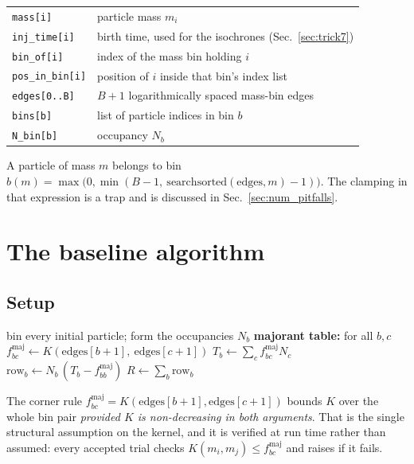 \documentclass[a4paper,12pt]{article}
\newcommand{\fmaj}{f^{\mathrm{maj}}}
\newcommand{\code}[1]{\texttt{#1}}
\begin{document}
\begin{center}
\small
\begin{tabular}{@{}ll@{}}
\toprule
\code{mass[i]}       & particle mass $m_i$ \\
\code{inj\_time[i]}  & birth time, used for the isochrones (Sec.~\ref{sec:trick7}) \\
\code{bin\_of[i]}    & index of the mass bin holding $i$ \\
\code{pos\_in\_bin[i]} & position of $i$ inside that bin's index list \\
\midrule
\code{edges[0..B]}   & $B+1$ logarithmically spaced mass-bin edges \\
\code{bins[b]}       & list of particle indices in bin $b$ \\
\code{N\_bin[b]}     & occupancy $N_b$ \\
\bottomrule
\end{tabular}
\end{center}

A particle of mass $m$ belongs to bin
$b(m) = \max\bigl(0,\min(B-1,\ \mathrm{searchsorted}(\text{edges},m)-1)\bigr)$.
The clamping in that expression is a trap and is discussed in
Sec.~\ref{sec:num_pitfalls}.

\section{The baseline algorithm}
\label{sec:num_algorithm}

\subsection{Setup}

\begin{algorithm}[h]
\caption{Setup: bins, majorant table, rate vector}
\label{alg:setup}
\begin{algorithmic}[1]
\State bin every initial particle; form the occupancies $N_b$
\State \textbf{majorant table:} for all $b,c$ \quad
       $\fmaj_{bc} \gets K(\text{edges}[b+1],\ \text{edges}[c+1])$
\State $T_b \gets \sum_c \fmaj_{bc} N_c$
\State $\text{row}_b \gets N_b\,(T_b - \fmaj_{bb})$
\State $R \gets \sum_b \text{row}_b$
\end{algorithmic}
\end{algorithm}

The corner rule $\fmaj_{bc}=K(\text{edges}[b+1],\text{edges}[c+1])$ bounds
$K$ over the whole bin pair \emph{provided $K$ is non-decreasing in both
arguments}. That is the single structural assumption on the kernel, and it
is verified at run time rather than assumed: every accepted trial checks
$K(m_i,m_j) \le \fmaj_{bc}$ and raises if it fails.
\end{document}
